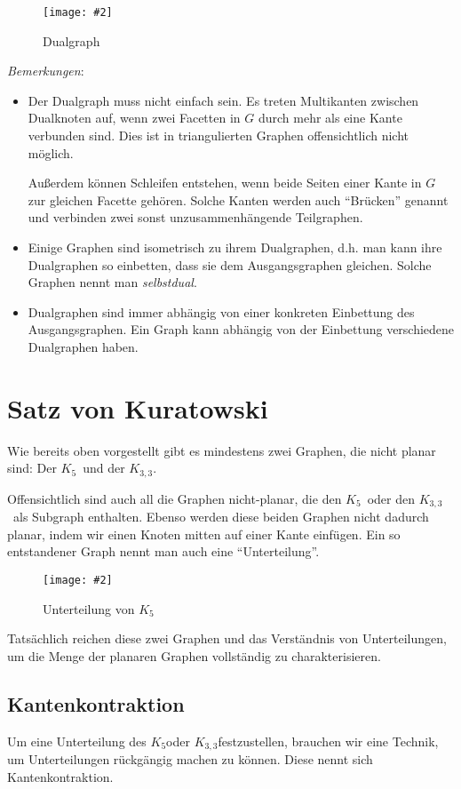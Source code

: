 \documentclass[10pt,a4paper]{article}
\makeatletter
\def\maxwidth#1{\ifdim\Gin@nat@width>#1 #1\else\Gin@nat@width\fi}
\newcommand{\imageFigure}[4]{%
    \begin{figure}[h]%
        \centering%
        {%
            \setlength{\fboxsep}{1pt}%
            \setlength{\fboxrule}{1pt}%
            \texttt{[image: \#2]}%
        }%
        \caption{#1}%
        \label{fig:#4}%
    \end{figure}%
}
\newcommand{\Kf}{$K_5$}
\newcommand{\Kdd}{$K_{3,3}$}
\makeatother
\begin{document}
\imageFigure{Dualgraph}{dual.png}{.5}{dual}

\textit{Bemerkungen}:
\begin{itemize}
    \item Der Dualgraph muss nicht einfach sein.
        Es treten Multikanten zwischen Dualknoten auf, wenn zwei Facetten in
        $G$ durch mehr als eine Kante verbunden sind.
        Dies ist in triangulierten Graphen offensichtlich nicht möglich.

        Außerdem können Schleifen entstehen, wenn beide Seiten einer Kante in
        $G$ zur gleichen Facette gehören.
        Solche Kanten werden auch \enquote{Brücken} genannt und verbinden zwei
        sonst unzusammenhängende Teilgraphen.
    \item Einige Graphen sind isometrisch zu ihrem Dualgraphen, d.h. man kann
        ihre Dualgraphen so einbetten, dass sie dem Ausgangsgraphen gleichen.
        Solche Graphen nennt man \textit{selbstdual}.
    \item Dualgraphen sind immer abhängig von einer konkreten Einbettung des
        Ausgangsgraphen.
        Ein Graph kann abhängig von der Einbettung verschiedene Dualgraphen
        haben.
\end{itemize}


\section{Satz von Kuratowski}
Wie bereits oben vorgestellt gibt es mindestens zwei Graphen, die nicht planar
sind:
Der \Kf~und der \Kdd.

Offensichtlich sind auch all die Graphen nicht-planar, die den \Kf~oder den
\Kdd~als Subgraph enthalten.
Ebenso werden diese beiden Graphen nicht dadurch planar, indem wir einen Knoten
mitten auf einer Kante einfügen.
Ein so entstandener Graph nennt man auch eine \enquote{Unterteilung}.
\imageFigure{Unterteilung von \Kf}{k5-unt.png}{.2}{k5-unt}

Tatsächlich reichen diese zwei Graphen und das Verständnis von Unterteilungen,
um die Menge der planaren Graphen vollständig zu charakterisieren.
\subsection{Kantenkontraktion}
Um eine Unterteilung des \Kf oder \Kdd festzustellen, brauchen wir eine
Technik, um Unterteilungen rückgängig machen zu können.
Diese nennt sich Kantenkontraktion.
\end{document}
